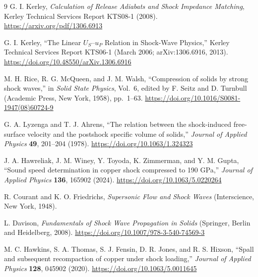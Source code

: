 \documentclass[11pt]{article}
\begin{document}
\begin{thebibliography}{9}
G. I. Kerley, \emph{Calculation of Release Adiabats and Shock Impedance
Matching}, Kerley Technical Services Report KTS08-1 (2008).
\url{https://arxiv.org/pdf/1306.6913}

G. I. Kerley, ``The Linear $U_S$--$u_P$ Relation in Shock-Wave Physics,''
Kerley Technical Services Report KTS06-1 (March 2006; arXiv:1306.6916, 2013).
\url{https://doi.org/10.48550/arXiv.1306.6916}

M. H. Rice, R. G. McQueen, and J. M. Walsh, ``Compression of solids by strong
shock waves,'' in \emph{Solid State Physics}, Vol.~6, edited by F. Seitz and
D. Turnbull (Academic Press, New York, 1958), pp.~1--63.
\url{https://doi.org/10.1016/S0081-1947(08)60724-9}

G. A. Lyzenga and T. J. Ahrens, ``The relation between the shock-induced
free-surface velocity and the postshock specific volume of solids,''
\emph{Journal of Applied Physics} \textbf{49}, 201--204 (1978).
\url{https://doi.org/10.1063/1.324323}

J. A. Hawreliak, J. M. Winey, Y. Toyoda, K. Zimmerman, and Y. M. Gupta,
``Sound speed determination in copper shock compressed to 190 GPa,'' \emph{Journal of
Applied Physics} \textbf{136}, 165902 (2024).
\url{https://doi.org/10.1063/5.0220264}

R. Courant and K. O. Friedrichs, \emph{Supersonic Flow and Shock Waves}
(Interscience, New York, 1948).

L. Davison, \emph{Fundamentals of Shock Wave Propagation in Solids}
(Springer, Berlin and Heidelberg, 2008).
\url{https://doi.org/10.1007/978-3-540-74569-3}

M. C. Hawkins, S. A. Thomas, S. J. Fensin, D. R. Jones, and R. S. Hixson,
``Spall and subsequent recompaction of copper under shock loading,''
\emph{Journal of Applied Physics} \textbf{128}, 045902 (2020).
\url{https://doi.org/10.1063/5.0011645}
\end{thebibliography}
\end{document}
